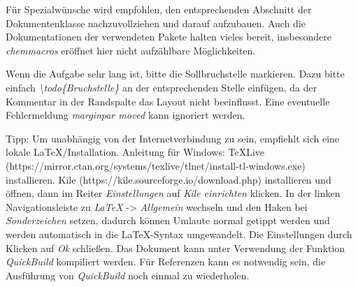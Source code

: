 \documentclass[./main.tex]{subfiles}
\begin{document}
F\"ur Spezialw\"unsche wird empfohlen, den entsprechenden Abschnitt der Dokumentenklasse nachzuvollziehen und darauf aufzubauen. Auch die Dokumentationen der verwendeten Pakete halten vieles bereit, insbesondere \textit{chemmacros} er\"offnet hier nicht aufz\"ahlbare M\"oglichkeiten. \par 
Wenn die Aufgabe sehr lang ist, bitte die Sollbruchstelle markieren. Dazu bitte einfach \textit{\textbackslash{}todo\{Bruchstelle\}} an der entsprechenden Stelle einf\"ugen, da der Kommentar in der Randspalte das Layout nicht beeinflusst. Eine eventuelle Fehlermeldung \textit{marginpar moved} kann ignoriert werden. 

\bigskip
Tipp: Um unabh\"angig von der Internetverbindung zu sein, empfiehlt sich eine lokale \LaTeX\-/Installation. Anleitung f\"ur Windows: TeXLive (https://mirror.ctan.org/systems/texlive/tlnet/install-tl-windows.exe) installieren. Kile (https://kile.sourceforge.io/download.php) installieren und \"offnen, dann im Reiter \textit{Einstellungen} auf \textit{Kile einrichten} klicken. In der linken Navigationsleiste zu \textit{LaTeX} -> \textit{Allgemein} wechseln und den Haken bei \textit{Sonderzeichen} setzen, dadurch k\"onnen Umlaute normal getippt werden und werden automatisch in die \LaTeX-Syntax umgewandelt. Die Einstellungen durch Klicken auf \textit{Ok} schlie\ss{}en. Das Dokument kann unter Verwendung der Funktion \textit{QuickBuild} kompiliert werden. F\"ur Referenzen kann es notwendig sein, die Ausf\"uhrung von \textit{QuickBuild} noch einmal zu wiederholen.
\end{document}
